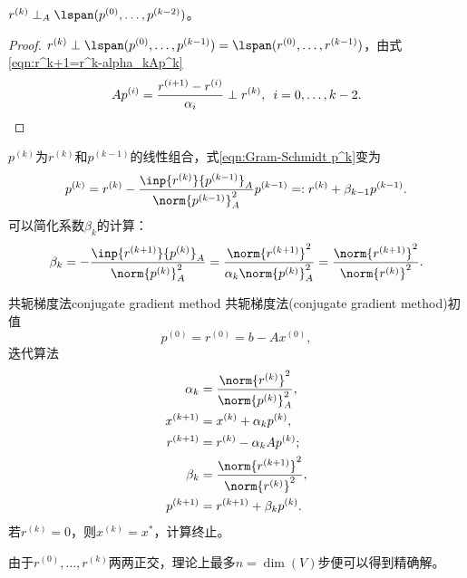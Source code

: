 \begin{theorem}
    {}{}
    $r^{(k)}\perp_A\lspan(p^{(0)},\ldots,p^{(k-2)})$。
\end{theorem}

\begin{proof}
    $r^{(k)}\perp\lspan(p^{(0)},\ldots,p^{(k-1)})=\lspan(r^{(0)},\ldots,r^{(k-1)})$，由式\eqref{eqn:r^k+1=r^k-alpha_kAp^k}
    \[
        Ap^{(i)}=\frac{r^{(i+1)}-r^{(i)}}{\alpha_i}\perp r^{(k)},\enspace i=0,\ldots,k-2.
        \qedhere
    \]
\end{proof}

\begin{corollary}
    $p^{(k)}$为$r^{(k)}$和$p^{(k-1)}$的线性组合，式\eqref{eqn:Gram-Schmidt p^k}变为
    \[
        p^{(k)}=r^{(k)}-\frac{\inp{r^{(k)}}{p^{(k-1)}}_A}{\norm{p^{(k-1)}}_A^2}p^{(k-1)}=:r^{(k)}+\beta_{k-1}p^{(k-1)}.
    \]
    可以简化系数$\beta_k$的计算：
    \[
        \beta_k=-\frac{\inp{r^{(k+1)}}{p^{(k)}}_A}{\norm{p^{(k)}}_A^2}=\frac{\norm{r^{(k+1)}}^2}{\alpha_k\norm{p^{(k)}}_A^2}=\frac{\norm{r^{(k+1)}}^2}{\norm{r^{(k)}}^2}.
    \]
\end{corollary}

\begin{theorem}
    {共轭梯度法}{conjugate gradient method}
    共轭梯度法(conjugate gradient method)初值
    \begin{equation}
        p^{(0)}=r^{(0)}=b-Ax^{(0)},
    \end{equation}
    迭代算法
    \begin{subequations}
        \begin{align}
            \alpha_k&=\frac{\norm{r^{(k)}}^2}{\norm{p^{(k)}}_A^2},\\
            x^{(k+1)}&=x^{(k)}+\alpha_kp^{(k)},\\
            r^{(k+1)}&=r^{(k)}-\alpha_kAp^{(k)};\\
            \beta_k&=\frac{\norm{r^{(k+1)}}^2}{\norm{r^{(k)}}^2},\\
            p^{(k+1)}&=r^{(k+1)}+\beta_kp^{(k)}.
        \end{align}
    \end{subequations}
    若$r^{(k)}=0$，则$x^{(k)}=x^*$，计算终止。
\end{theorem}

\begin{corollary}
    由于$r^{(0)},\ldots,r^{(k)}$两两正交，理论上最多$n=\dim(V)$步便可以得到精确解。
\end{corollary}

